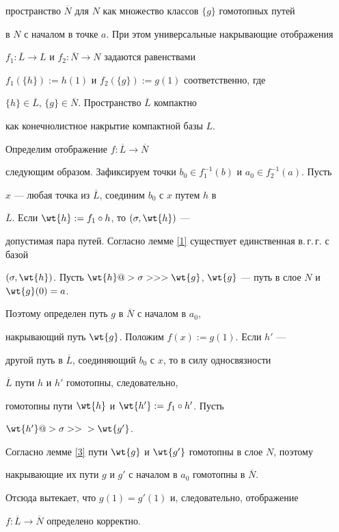 \begin{pf}
пространство $\overline{N}$ для $N$ как множество классов $\{g\}$ гомотопных путей


в $N$  с началом в точке $a$. При этом универсальные накрывающие отображения


$f_1: \overline{L}\to L$ и $f_2: \overline{N}\to N$ задаются равенствами


$f_1(\{h\}):=h(1)$ и $f_2(\{g\}):=g(1)$ соответственно, где


$\{h\}\in\overline{L}$, $\{g\}\in\overline{N}$. Пространство $\overline{L}$ компактно


как конечнолистное накрытие компактной базы $L$.


Определим отображение $f:\overline{L}\to\overline{N}$


следующим образом. Зафиксируем точки $b_0\in f_1^{-1}(b)$ и $a_0\in f_2^{-1}(a)$. Пусть


$x$ --- любая точка из $\overline{L}$, соединим $b_0$ с $x$ путем $h$ в


$\overline{L}$. Если $\wt{h}:=f_1\circ h$, то $(\sigma,\wt{h})$ ---


допустимая пара путей. Согласно лемме \ref{1} существует единственная в.\,г.\,г. с базой


$(\sigma,\wt{h})$. Пусть $\wt{h}@> {\sigma}>>


>\wt{g}$, $\wt{g}$ --- путь в слое $N$ и $\wt{g}(0)=a$.


Поэтому определен путь $g$ в $\overline{N}$ с началом в $a_0$,


накрывающий путь $\wt{g}$. Положим $f(x):=g(1)$. Если $h'$ ---


другой путь в $\overline{L}$, соединяющий $b_0$ с $x$, то в силу односвязности


$\overline{L}$ пути $h$ и $h'$ гомотопны, следовательно,


гомотопны пути $\wt{h}$ и $\wt{h'}


:=f_1\circ h'$. Пусть


$\wt{h'}@> {\sigma}>>{} >\wt{g'}$.


Согласно лемме \ref{3} пути $\wt{g}$ и $\wt{g'}$ гомотопны в слое $N$, поэтому


накрывающие их пути $g$ и $g'$ с началом в $a_0$ гомотопны в $\overline{N}$.


Отсюда вытекает, что $g(1)=g'(1)$ и, следовательно, отображение


$f:\overline{L}\to\overline{N}$ определено корректно.






\end{pf}
